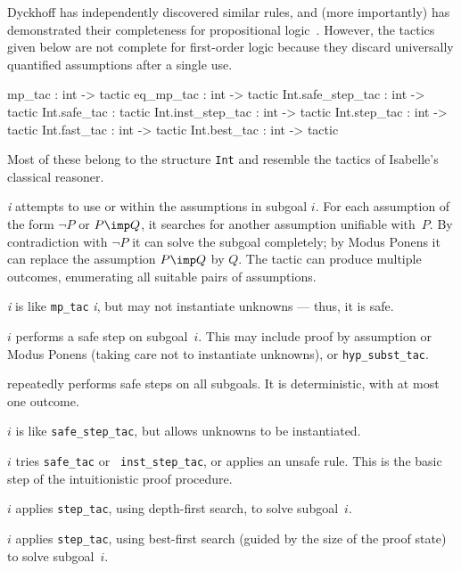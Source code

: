 Dyckhoff has independently discovered similar rules, and (more importantly)
has demonstrated their completeness for propositional
logic~\cite{dyckhoff}.  However, the tactics given below are not complete
for first-order logic because they discard universally quantified
assumptions after a single use.
\begin{ttbox} 
mp_tac            : int -> tactic
eq_mp_tac         : int -> tactic
Int.safe_step_tac : int -> tactic
Int.safe_tac      :        tactic
Int.inst_step_tac : int -> tactic
Int.step_tac      : int -> tactic
Int.fast_tac      : int -> tactic
Int.best_tac      : int -> tactic
\end{ttbox}
Most of these belong to the structure {\tt Int} and resemble the
tactics of Isabelle's classical reasoner.

\begin{ttdescription}
\item[\ttindexbold{mp_tac} {\it i}] 
attempts to use  or  within the assumptions in
subgoal $i$.  For each assumption of the form $\neg P$ or $P\imp Q$, it
searches for another assumption unifiable with~$P$.  By
contradiction with $\neg P$ it can solve the subgoal completely; by Modus
Ponens it can replace the assumption $P\imp Q$ by $Q$.  The tactic can
produce multiple outcomes, enumerating all suitable pairs of assumptions.

\item[\ttindexbold{eq_mp_tac} {\it i}] 
is like {\tt mp_tac} {\it i}, but may not instantiate unknowns --- thus, it
is safe.

\item[\ttindexbold{Int.safe_step_tac} $i$] performs a safe step on
subgoal~$i$.  This may include proof by assumption or Modus Ponens (taking
care not to instantiate unknowns), or {\tt hyp_subst_tac}. 

\item[\ttindexbold{Int.safe_tac}] repeatedly performs safe steps on all 
subgoals.  It is deterministic, with at most one outcome.

\item[\ttindexbold{Int.inst_step_tac} $i$] is like {\tt safe_step_tac},
but allows unknowns to be instantiated.

\item[\ttindexbold{Int.step_tac} $i$] tries {\tt safe_tac} or {\tt
    inst_step_tac}, or applies an unsafe rule.  This is the basic step of
  the intuitionistic proof procedure.

\item[\ttindexbold{Int.fast_tac} $i$] applies {\tt step_tac}, using
depth-first search, to solve subgoal~$i$.

\item[\ttindexbold{Int.best_tac} $i$] applies {\tt step_tac}, using
best-first search (guided by the size of the proof state) to solve subgoal~$i$.
\end{ttdescription}

